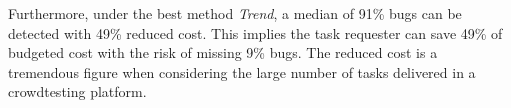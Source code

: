\documentclass[sigconf,review, anonymous]{acmart}
\begin{document}
Furthermore, under the best method \textit{Trend}, a median of 91\% bugs can be detected with 49\% reduced cost.
This implies the task requester can save 49\% of budgeted cost with the risk of missing 9\% bugs. 
The reduced cost is a tremendous figure when considering the large number of tasks delivered in a crowdtesting platform.


% 




% 
% 




\end{document}
